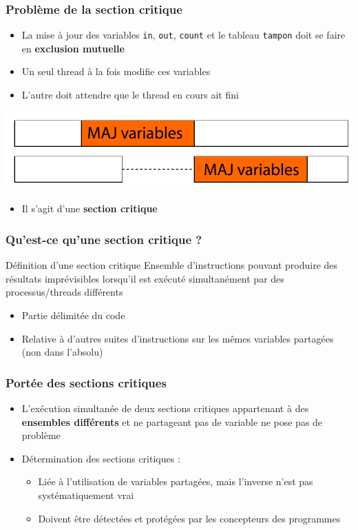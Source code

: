 \begin{frame}
\frametitle{Problème de la section critique}
\begin{itemize}
\item La mise à jour des variables \texttt{in}, \texttt{out}, \texttt{count} et le tableau \texttt{tampon} doit se faire en \textbf{exclusion mutuelle}
\item Un seul thread à la fois modifie ces variables
\item L'autre doit attendre que le thread en cours ait fini
\end{itemize}
\begin{flushright}
\includegraphics[width=.5\textwidth]{../illustration/sc_maj_count.pdf}
\end{flushright}
\begin{itemize}
\item Il s’agit d’une \textbf{section critique}
\end{itemize}
\end{frame}

\begin{frame}
\frametitle{Qu'est-ce qu'une section critique ?}
\begin{block}{Définition d'une section critique}
Ensemble d'instructions pouvant produire des résultats imprévisibles lorsqu’il est exécuté simultanément par des processus/threads différents
\end{block}
\begin{itemize}
\item Partie délimitée du code
\item Relative à d'autres suites d'instructions sur les mêmes variables partagées (non dans l'absolu)
\end{itemize}
\end{frame}

\begin{frame}
\frametitle{Portée des sections critiques}
\begin{itemize}
\item L'exécution simultanée de deux sections critiques appartenant à des \textbf{ensembles différents} et ne partageant pas de variable ne pose pas de problème
\item Détermination des sections critiques :
\begin{itemize}
\item Liée à l’utilisation de variables partagées, mais l'inverse n'est pas systématiquement vrai
\item Doivent être détectées et protégées par les concepteurs des programmes
\end{itemize}
\end{itemize}
\end{frame}

